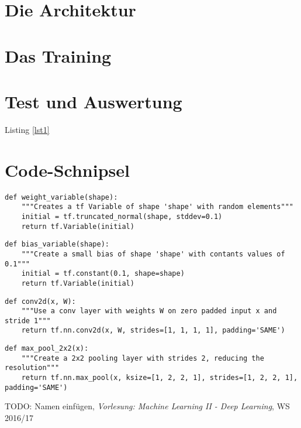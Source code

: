 \documentclass[10pt,journal,compsoc]{IEEEtran}
\begin{document}
\section{Die Architektur}

\section{Das Training}

\section{Test und Auswertung}
Listing \ref{lst1}

\appendices
\section{Code-Schnipsel}

\begin{lstlisting}[caption={Erzeugt ein Gewichts-Array mit zufällig initialisierten Werten. Die Dimensionen werden als Parameter entegengenommen.}, label=lst1]
def weight_variable(shape):
    """Creates a tf Variable of shape 'shape' with random elements"""
    initial = tf.truncated_normal(shape, stddev=0.1)
    return tf.Variable(initial)
\end{lstlisting}

\begin{lstlisting}[caption={Erzeugt ein bias-Array mit zufällig initialisierten Werten. Die Dimensionen werden als Parameter entegengenommen.}, label=lst2]
def bias_variable(shape):
    """Create a small bias of shape 'shape' with contants values of 0.1"""
    initial = tf.constant(0.1, shape=shape)
    return tf.Variable(initial)
\end{lstlisting}

\begin{lstlisting}[caption={Eine zweidimensionale Faltung mit Eingabe x und Filter W.}, label=lst3]
def conv2d(x, W):
    """Use a conv layer with weights W on zero padded input x and stride 1"""
    return tf.nn.conv2d(x, W, strides=[1, 1, 1, 1], padding='SAME')
\end{lstlisting}

\begin{lstlisting}[caption={Hier wird 2x2 max pooling auf die Eingabe x angewendet.}, label=lst4]
def max_pool_2x2(x):
    """Create a 2x2 pooling layer with strides 2, reducing the resolution"""
    return tf.nn.max_pool(x, ksize=[1, 2, 2, 1], strides=[1, 2, 2, 1], padding='SAME')
\end{lstlisting}

\ifCLASSOPTIONcaptionsoff
  \newpage
\fi

\begin{thebibliography}{1}
TODO: Namen einfügen, \emph{Vorlesung: Machine Learning II - Deep Learning}, WS 2016/17
\end{thebibliography}
\end{document}
